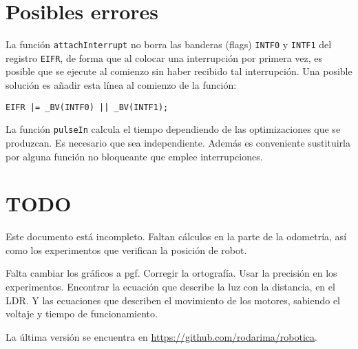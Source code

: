 \documentclass[10pt,a4paper,hidelinks,twocolumn]{article}
\begin{document}
\section{Posibles errores}

La función \texttt{attachInterrupt} no borra las banderas (flags) \texttt{INTF0} 
y \texttt{INTF1} del registro \texttt{EIFR}, de forma que al colocar una 
interrupción por primera vez, es posible que se ejecute al comienzo sin haber 
recibido tal interrupción. Una posible solución es añadir esta línea al comienzo 
de la función:

\texttt{EIFR |= \_BV(INTF0) || \_BV(INTF1);}

La función \texttt{pulseIn} calcula el tiempo dependiendo de las optimizaciones
que se produzcan. Es necesario que sea independiente. Además es conveniente
sustituirla por alguna función no bloqueante que emplee interrupciones.
\section{TODO}
Este documento está incompleto. Faltan cálculos en la parte de la odometría, así 
como los experimentos que verifican la posición de robot.

Falta cambiar los gráficos a pgf. Corregir la ortografía. Usar la precisión en 
los experimentos. Encontrar la ecuación que describe la luz con la distancia, en 
el LDR. Y las ecuaciones que describen el movimiento de los motores, sabiendo el 
voltaje y tiempo de funcionamiento.

La última versión se encuentra en \url{https://github.com/rodarima/robotica}.
\end{document}
